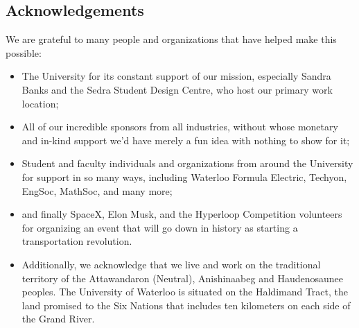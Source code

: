 \documentclass[main.tex]{subfiles}
\begin{document}
\subsection{Acknowledgements}

We are grateful to many people and organizations that have helped make this possible:
\begin{itemize}
	\item The University for its constant support of our mission, especially Sandra Banks and the Sedra Student Design Centre, who host our primary work location;

	\item All of our incredible sponsors from all industries, without whose monetary and in-kind support we'd have merely a fun idea with nothing to show for it;

	\item Student and faculty individuals and organizations from around the University for support in so many ways, including Waterloo Formula Electric, Techyon, EngSoc, MathSoc, and many more;

	\item and finally SpaceX, Elon Musk, and the Hyperloop Competition volunteers for organizing an event that will go down in history as starting a transportation revolution.

	\item Additionally, we acknowledge that we live and work on the traditional territory of the Attawandaron (Neutral), Anishinaabeg and Haudenosaunee peoples. The University of Waterloo is situated on the Haldimand Tract, the land promised to the Six Nations that includes ten kilometers on each side of the Grand River.
\end{itemize}

\newpage
\end{document}
